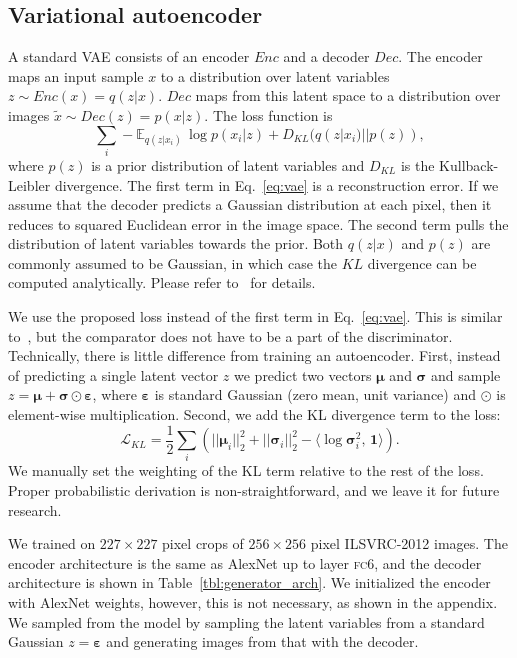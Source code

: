 \documentclass{article}
\newcommand{\fc}{\textsc{fc}}
\newcommand{\loss}{\mathcal{L}}
\newcommand{\klloss}{\loss_{KL}}
\newcommand{\enc}{Enc}
\newcommand{\dec}{Dec}
\newcommand{\vaein}{x}
\newcommand{\vaerec}{\tilde{\vaein}}
\newcommand{\latent}{z}
\newcommand{\expect}{\mathbb{E}}
\newcommand{\kldiv}{D_{KL}}
\newcommand{\vaemean}{\mathbf{\mu}}
\newcommand{\vaesigma}{\mathbf{\sigma}}
\newcommand{\vaenoise}{\mathbf{\varepsilon}}
\begin{document}
\subsection{Variational autoencoder} \label{sec:exp_vae}
A standard VAE consists of an encoder $\enc$ and a decoder $\dec$.
The encoder maps an input sample $\vaein$ to a distribution over latent variables $\latent \sim \enc(\vaein) = q(\latent|\vaein)$.
$\dec$ maps from this latent space to a distribution over images $\vaerec \sim \dec(\latent) = p(\vaein|\latent)$.
The loss function is 
\begin{equation}\label{eq:vae}
\sum\limits_i -\expect_{q(\latent|\vaein_i)}\, \log p(\vaein_i|\latent) + \kldiv (q(\latent| \vaein_i) || p(\latent)),
\end{equation}
where $p(\latent)$ is a prior distribution of latent variables and $\kldiv$ is the Kullback-Leibler divergence.
The first term in Eq.~\ref{eq:vae} is a reconstruction error.
If we assume that the decoder predicts a Gaussian distribution at each pixel, then it reduces to squared Euclidean error in the image space.
The second term pulls the distribution of latent variables towards the prior.
Both $q(\latent|\vaein)$ and $p(\latent)$ are commonly assumed to be Gaussian, in which case the $KL$ divergence can be computed analytically.
Please refer to~\citet{Kingma_NIPS2014} for details.

We use the proposed loss instead of the first term in Eq.~\ref{eq:vae}.
This is similar to~\citet{Larsen_arxiv2015}, but the comparator does not have to be a part of the discriminator.
Technically, there is little difference from training an autoencoder.
First, instead of predicting a single latent vector $z$ we predict two vectors $\vaemean$ and $\vaesigma$ and sample $z = \vaemean + \vaesigma \odot \vaenoise$, where $\vaenoise$ is standard Gaussian (zero mean, unit variance) and $\odot$ is element-wise multiplication.
Second, we add the KL divergence term to the loss:
\begin{equation}
 \klloss = \frac{1}{2}\sum\limits_i \left(||\vaemean_i||_2^2   + ||\vaesigma_i||^2_2 - \langle \log \vaesigma_i^2, \, \textbf{1} \rangle \right) .
\end{equation}
We manually set the weighting of the KL term relative to the rest of the loss. 
Proper probabilistic derivation is non-straightforward, and we leave it for future research.

We trained on $227 \times 227$ pixel crops of $256 \times 256$ pixel ILSVRC-2012 images.
The encoder architecture is the same as AlexNet up to layer \fc6, and the decoder architecture is shown in Table~\ref{tbl:generator_arch}.
We initialized the encoder with AlexNet weights, however, this is not necessary, as shown in the appendix.
We sampled from the model by sampling the latent variables from a standard Gaussian $z = \vaenoise$ and generating images from that with the decoder.
\end{document}
